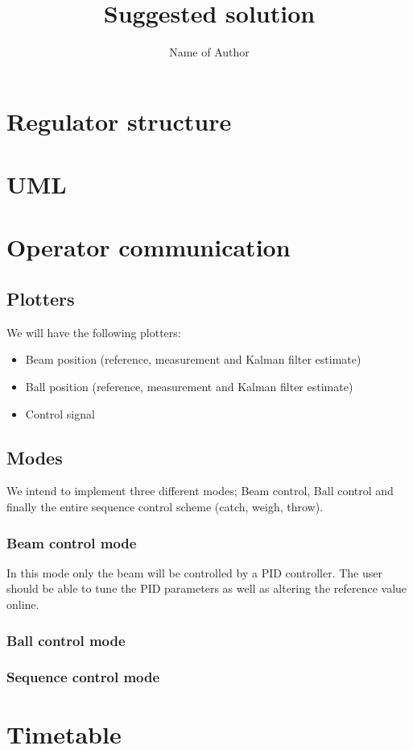 \documentclass{article}
\title{Suggested solution}
\author{Name of Author}
\begin{document}
\maketitle

\section{Regulator structure}


\section{UML}


\section{Operator communication}
\subsection{Plotters}
We will have the following plotters:
\begin{itemize}
\item Beam position (reference, measurement and Kalman filter estimate)
\item Ball position (reference, measurement and Kalman filter estimate)
\item Control signal
\end{itemize}

\subsection{Modes}
We intend to implement three different modes; Beam control, Ball control and finally the entire sequence control scheme (catch, weigh, throw).
\subsubsection{Beam control mode}
In this mode only the beam will be controlled by a PID controller. The user should be able to tune the PID parameters as well as altering the reference value online.

\subsubsection{Ball control mode}


\subsubsection{Sequence control mode}

\section{Timetable}
\end{document}
